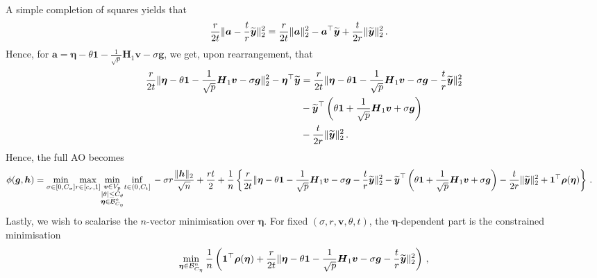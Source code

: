 \documentclass{article}
\makeatletter
\theoremstyle{definition}
\newcommand{\vnorm}[1]{%
	\ensuremath{%
		\if@display
		\left\| #1 \right\|
		\else
		\| #1 \|
		\fi
	}%
}
\newcommand{\abs}[1]{%
	\ensuremath{%
		\if@display
		\left| #1 \right|
		\else
		\lvert #1 \rvert
		\fi
	}%
}
\newcommand*{\bb}{\boldsymbol}
\def\bH {\bb{H}}
\def\bv{\bb{v}}
\def\bg{\bb{g}}
\def\bYtil{\widetilde{\bb{y}}}
\def\bH{\bb{H}}
\makeatother
\begin{document}
\begin{bibunit}
\begin{equation}
\begin{aligned}
	    \end{aligned}
\end{equation}
A simple completion of squares yields that
$$
    \begin{aligned}
        \frac{r}{2t} \vnorm{\bb a - \frac{t}{r} \bYtil}_2^2 &= \frac{r}{2t} \vnorm{\bb a}_2^2 - \bb a^\top \bYtil + \frac{t}{2r} \vnorm{\bYtil}_2^2 \,.
    \end{aligned}
$$
Hence, for $\bb a = \bb{\eta}- \theta \bb 1 - \frac{1}{\sqrt{p}}\bH_1 \bv -  \sigma\bb g$, we
get, upon rearrangement, that
\begin{equation}
\label{eq:completion-of-squares}
    \begin{aligned}
        \frac{r}{2t} \vnorm{\bb{\eta}- \theta \bb 1 - \frac{1}{\sqrt{p}}\bH_1 \bv -  \sigma\bb g}_2^2
    - \bb{\eta}^\top \bYtil &=
    \frac{r}{2t} \vnorm{\bb{\eta}- \theta \bb 1 - \frac{1}{\sqrt{p}}\bH_1 \bv -  \sigma\bb g - \frac{t}{r} \bYtil}_2^2 \\
    &- \bYtil^\top\left(\theta \bb 1 + \frac{1}{\sqrt{p}}\bH_1 \bv + \sigma\bb g  \right) \\
    &- \frac{t}{2r} \vnorm{\bYtil}^2_2 \,.
    \end{aligned}
\end{equation}
Hence, the full AO becomes
$$
    \begin{aligned}
        \phi(\bb g, \bb h) 
        &= \underset{\sigma \in [0, C_\sigma]}{\min} \underset{r \in [c_r, 1]}{\max}
        \underset{\substack{\bv \in V_p\\ \abs{\theta} \leq C_\theta\\
        \bb{\eta} \in \mathcal{B}^n_{C_\eta}}}{\min} \underset{t \in (0, C_t]}{\inf} \,
        -\sigma r \frac{\vnorm{\bb h}_2}{\sqrt{n}} + \frac{rt}{2} 
        + \frac{1}{n} \left\{ \frac{r}{2t}\vnorm{\bb{\eta}- \theta \bb 1 - \frac{1}{\sqrt{p}}\bH_1 \bv -  \sigma\bb g - \frac{t}{r} \bYtil}_2^2 
    - \bYtil^\top\left(\theta \bb 1 + \frac{1}{\sqrt{p}}\bH_1 \bv +  \sigma\bb g \right)
    - \frac{t}{2r} \vnorm{\bYtil}^2_2  + \bb 1^\top \bb \rho (\bb{\eta})\right\}  \,.
    \end{aligned}
$$
Lastly, we wish to scalarise the $n$-vector minimisation over $\bb \eta$. 
For fixed $(\sigma,r,\bv,\theta,t)$, the $\bb\eta$-dependent part is
the constrained minimisation
\begin{equation}
	\label{eq:constr_moreau}
		\begin{aligned}
		\underset{\bb{\eta} \in \mathcal{B}^n_{C_\eta}}{\min} \, \frac{1}{n} \left( \bb 1^\top \bb \rho(\bb{\eta}) + \frac{r}{2t} \vnorm{\bb{\eta} - \theta \bb 1 - \frac{1}{\sqrt{p}} \bH_1 \bv - \sigma \bg - \frac{t}{r} \bYtil}_2^2 \right) \,,

\end{aligned}
\end{equation}
\end{bibunit}
\end{document}
